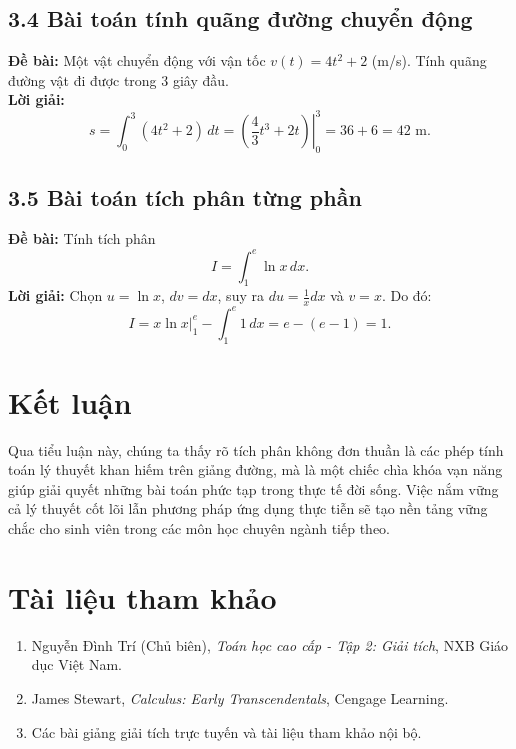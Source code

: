 \documentclass[12pt,a4paper]{article}
\begin{document}
\subsection{3.4 Bài toán tính quãng đường chuyển động}
\textbf{Đề bài:} Một vật chuyển động với vận tốc
$v(t)=4t^2+2$ (m/s). Tính quãng đường vật đi được trong $3$ giây đầu.\\
\textbf{Lời giải:}
\[
s=\int_0^3(4t^2+2)\,dt
=\left.\left(\frac{4}{3}t^3+2t\right)\right|_0^3
=36+6=42\text{ m}.
\]

\subsection{3.5 Bài toán tích phân từng phần}
\textbf{Đề bài:} Tính tích phân
\[
I=\int_1^e\ln x\,dx.
\]
\textbf{Lời giải:}
Chọn $u=\ln x$, $dv=dx$, suy ra $du=\frac{1}{x}dx$ và $v=x$.
Do đó:
\[
I=\left.x\ln x\right|_1^e-\int_1^e1\,dx
=e-(e-1)=1.
\]

\section*{Kết luận}
Qua tiểu luận này, chúng ta thấy rõ tích phân không đơn thuần là các phép tính toán lý thuyết khan hiếm trên giảng đường, mà là một chiếc chìa khóa vạn năng giúp giải quyết những bài toán phức tạp trong thực tế đời sống. Việc nắm vững cả lý thuyết cốt lõi lẫn phương pháp ứng dụng thực tiễn sẽ tạo nền tảng vững chắc cho sinh viên trong các môn học chuyên ngành tiếp theo.

\section*{Tài liệu tham khảo}
\begin{enumerate}
    \item Nguyễn Đình Trí (Chủ biên), \textit{Toán học cao cấp - Tập 2: Giải tích}, NXB Giáo dục Việt Nam.
    \item James Stewart, \textit{Calculus: Early Transcendentals}, Cengage Learning.
    \item Các bài giảng giải tích trực tuyến và tài liệu tham khảo nội bộ.
\end{enumerate}
\end{document}

